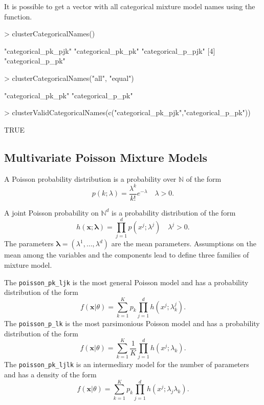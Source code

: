 \documentclass[shortnames,nojss,article]{jss}
\newcommand{\N}{\mathbb{N}}
\newcommand{\Nd}{{\mathbb{N}^d}}
\newcommand{\bx}{\mathbf{x}}
\newcommand{\blambda}{\boldsymbol{\lambda}}
\begin{document}
It is possible to get a vector with all categorical mixture model names using
the  function.
\begin{Schunk}
\begin{Sinput}
> clusterCategoricalNames()
\end{Sinput}
\begin{Soutput}
[1] "categorical_pk_pjk" "categorical_pk_pk"  "categorical_p_pjk" 
[4] "categorical_p_pk"  
\end{Soutput}
\begin{Sinput}
> clusterCategoricalNames("all", "equal")
\end{Sinput}
\begin{Soutput}
[1] "categorical_pk_pk" "categorical_p_pk" 
\end{Soutput}
\begin{Sinput}
> clusterValidCategoricalNames(c("categorical_pk_pjk","categorical_p_pk"))
\end{Sinput}
\begin{Soutput}
[1] TRUE
\end{Soutput}
\end{Schunk}

\subsection{Multivariate Poisson Mixture Models}
\label{subsec:Poisson}

A Poisson probability distribution is a probability over $\N$ of the form
\begin{equation}\label{law::poisson-density}
p(k;\lambda) = \frac{ \lambda^k}{k!} e^{-\lambda}  \quad \lambda>0.
\end{equation}

A joint Poisson probability on $\Nd$ is a probability distribution of the form
\begin{equation}\label{law::joint-poisson-density}
h(\bx;\blambda) = \prod_{j=1}^d p(x^j;\lambda^j)  \quad \lambda^j>0.
\end{equation}
The parameters $\blambda=(\lambda^1,\ldots,\lambda^d)$ are the mean
parameters. Assumptions on the mean among the variables and the
components lead to define three families of mixture model.

The \verb+poisson_pk_ljk+ is the most general Poisson model and has a
probability distribution of the form
\begin{equation}
 f({\bx}|\theta) = \sum_{k=1}^K p_k  \prod_{j=1}^d h(x^j;\lambda^j_k).
\end{equation}
The \verb+poisson_p_lk+ is the most parsimonious Poisson model and has a
probability distribution of the form
\begin{equation}
 f({\bx}|\theta) = \sum_{k=1}^K \frac{1}{K} \prod_{j=1}^d h(x^j;\lambda_k).
\end{equation}
The \verb+poisson_pk_ljlk+ is an intermediary model for the number of parameters
and has a density of the form
\begin{equation}
 f({\bx}|\theta) = \sum_{k=1}^K p_k \prod_{j=1}^d h(x^j;\lambda_j\lambda_k).
\end{equation}
\end{document}
